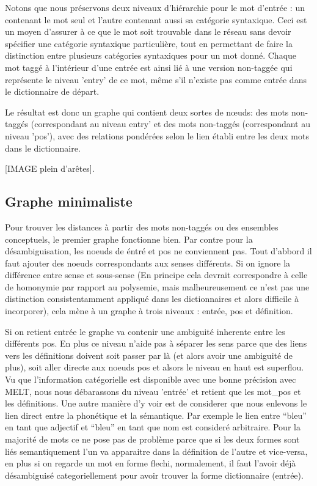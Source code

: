 Notons que nous préservons deux niveaux d'hiérarchie pour le mot d'entrée : un 
contenant le mot seul et l'autre contenant aussi sa catégorie syntaxique. Ceci 
est un moyen d'assurer à ce que le mot soit trouvable dans le réseau sans devoir 
spécifier une catégorie syntaxique particulière, tout en permettant de faire la 
distinction entre plusieurs catégories syntaxiques pour un mot donné. Chaque mot 
taggé à l'intérieur d'une entrée est ainsi lié à une version non-taggée qui 
représente le niveau 'entry' de ce mot, même s'il n'existe pas comme entrée dans 
le dictionnaire de départ.

Le résultat est donc un graphe qui contient deux sortes de nœuds: des mots non-taggés 
(correspondant au niveau entry' et des mots non-taggés (correspondant au niveau 
'pos'), avec des relations pondérées selon le lien établi entre les deux mots dans le dictionnaire.

[IMAGE plein d'arêtes].

\subsection{Graphe minimaliste}

Pour trouver les distances à partir des mots non-taggés ou des ensembles
conceptuels, le premier graphe fonctionne bien. Par contre pour
la désambiguisation, les noeuds de éntré et pos ne conviennent pas.
Tout d'abbord il faut ajouter des noeuds correspondants aux senses
différents. Si on ignore la différence entre sense et sous-sense (En principe
cela devrait correspondre à celle de homonymie par rapport au polysemie,
mais malheureusement ce n'est pas une distinction consistentamment appliqué
 dans les dictionnaires et alors difficile à incorporer), cela mène à un
graphe à trois niveaux : entrée, pos et définition.

Si on retient entrée le graphe va contenir une ambiguité inherente
entre les différents pos. En plus ce niveau n'aide pas à séparer les
sens parce que des liens vers les définitions doivent soit passer par
là (et alors avoir une ambiguité de plus), soit aller directe aux noeuds
pos et alsors le niveau en haut est superflou. Vu que l'information
catégorielle est disponible avec une bonne précision avec MELT, nous nous
débarassons du niveau 'entrée' et retient que les mot\_pos et les définitions.
Une autre manière d'y voir est de considerer que nous enlevons le lien direct
entre la phonétique et la sémantique. Par exemple le lien entre ``bleu''
en tant que adjectif et ``bleu'' en tant que nom est consideré arbitraire.
Pour la majorité de mots ce ne pose pas de problème parce que si les deux
formes sont liés semantiquement l'un va apparaitre dans la définition
de l'autre et vice-versa, en plus si on regarde un mot en forme flechi,
normalement, il
faut l'avoir déjà désambiguisé categoriellement pour avoir trouver la forme
dictionnaire (entrée).

